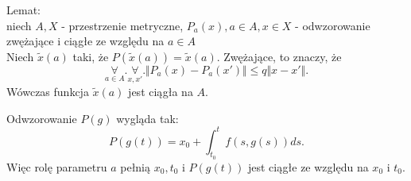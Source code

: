 \documentclass[../main.tex]{subfiles}
\begin{document}
        Lemat:\\
        niech $A,X$ - przestrzenie metryczne, $P_a(x), a\in A, x\in X$ - odwzorowanie zwężające i ciągłe ze względu na $a\in A$\\
        Niech $\tilde x(a)$ taki, że $P(\tilde x(a)) = \tilde x(a)$. Zwężające, to znaczy, że \[
            \underset{a\in A}{\forall}. \underset{x,x'}{\forall}. \Vert P_a(x) - P_a(x') \Vert \le q \Vert x-x' \Vert
        .\] Wówczas funkcja $\tilde x(a)$ jest ciągła na $A$.
        \begin{uwaga}
            Odwzorowanie $P(g)$ wygląda tak:
            \[
                P(g(t)) = x_0 + \int_{t_0}^t f(s,g(s))ds
            .\] Więc rolę parametru $a$ pełnią $x_0,t_0$ i $P(g(t))$ jest ciągłe ze względu na $x_0$ i $t_0$.
        \end{uwaga}
\end{document}
